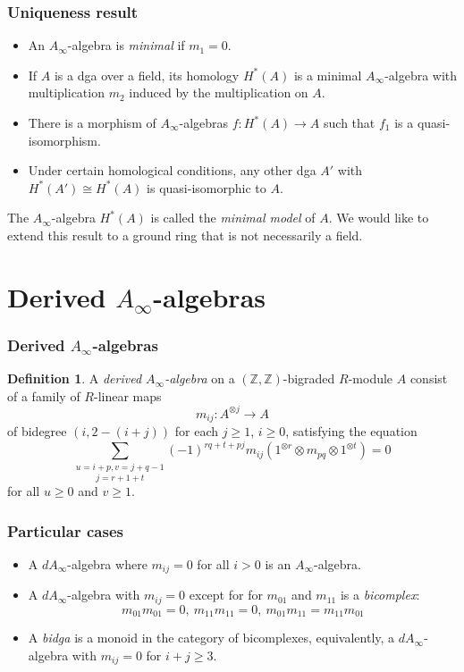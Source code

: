 \documentclass{beamer}
\theoremstyle{definition}
\newtheorem{defi}{Definition}
\newcommand{\Z}{\mathbb{Z}}
\begin{document}
\begin{frame}
\frametitle{Uniqueness result}
\begin{itemize}
\item An $A_\infty$-algebra is \emph{minimal} if $m_1 = 0$. 
\end{itemize}\pause
\begin{theorem}[Kadeishvili]
\begin{itemize}
\item If $A$ is a dga over a field, its homology $H^*(A)$ is a minimal $A_\infty$-algebra with multiplication $m_2$ induced by the multiplication on $A$.
\item There is a morphism of $A_\infty$-algebras $f:H^*(A)\to A$ such that $f_1$ is a quasi-isomorphism.
\item Under certain homological conditions, any other dga $A'$ with $H^*(A')\cong H^*(A)$ is quasi-isomorphic to $A$. 
\end{itemize}
\end{theorem}\pause
The $A_\infty$-algebra $H^*(A)$ is called the \emph{minimal model} of $A$.
We would like to extend this result to a ground ring that is not necessarily a field.
\end{frame}

\section{Derived $A_\infty$-algebras}

\begin{frame}
\frametitle{Derived $A_\infty$-algebras}
\begin{defi}
  A \emph{derived $A_\infty$-algebra} on a $(\Z,\Z)$-bigraded $R$-module $A$ consist of a family of $R$-linear maps 
\[m_{ij}:A^{\otimes j}\to A\]
of bidegree $(i,2-(i+j))$ for each $j\geq 1$, $i\geq 0$, satisfying the equation
\begin{equation}
\underset{j=r+1+t}{\sum_{u=i+p, v=j+q-1}}(-1)^{rq+t+pj}m_{ij}(1^{\otimes r}\otimes m_{pq}\otimes 1^{\otimes t})=0
\end{equation}
for all $u\geq 0$ and $v\geq 1$. 
\end{defi}
\end{frame}

\begin{frame}
\frametitle{Particular cases}
\begin{itemize}
\item<1-> A $dA_\infty$-algebra where $m_{ij}=0$ for all $i>0$ is an $A_\infty$-algebra.
\item<2-> A $dA_\infty$-algebra with $m_{ij}=0$ except for for $m_{01}$ and $m_{11}$ is a \emph{bicomplex}: 
\[m_{01}m_{01}=0,\ m_{11}m_{11}=0,\ m_{01}m_{11}=m_{11}m_{01}\]
\item<3-> A \emph{bidga} is a monoid in the category of bicomplexes, equivalently, a $dA_\infty$-algebra with $m_{ij}=0$ for $i+j\geq 3$.
\end{itemize}
\end{frame}
\end{document}
